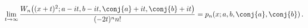 \[\lim_{t\to\infty}\frac{\mathop{W_{n}\/}\nolimits\!\left((x+t)^{2};a-it,b-it,%
\conj{a}+it,\conj{b}+it\right)}{(-2t)^{n}n!}=\mathop{p_{n}\/}\nolimits\!\left(%
x;a,b,\conj{a},\conj{b}\right).\]